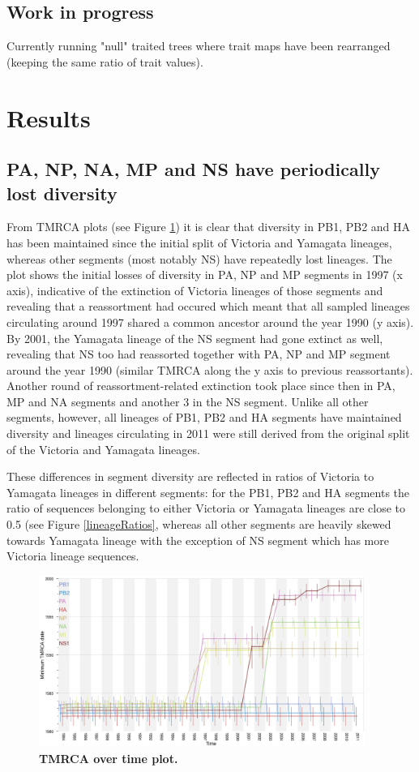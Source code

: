 \documentclass[11pt,oneside,letterpaper]{article}
\begin{document}
\subsection*{Work in progress}
Currently running "null" traited trees where trait maps have been rearranged (keeping the same ratio of trait values).


\section*{Results}

\subsection*{PA, NP, NA, MP and NS have periodically lost diversity}
From TMRCA plots (see Figure \ref{tmrcaOT}) it is clear that diversity in PB1, PB2 and HA has been maintained since the initial split of Victoria and Yamagata lineages, whereas other segments (most notably NS) have repeatedly lost lineages.
The plot shows the initial losses of diversity in PA, NP and MP segments in 1997 (x axis), indicative of the extinction of Victoria lineages of those segments and revealing that a reassortment had occured which meant that all sampled lineages circulating around 1997 shared a common ancestor around the year 1990 (y axis).
By 2001, the Yamagata lineage of the NS segment had gone extinct as well, revealing that NS too had reassorted together with PA, NP and MP segment around the year 1990 (similar TMRCA along the y axis to previous reassortants).
Another round of reassortment-related extinction took place since then in PA, MP and NA segments and another 3 in the NS segment.
Unlike all other segments, however, all lineages of PB1, PB2 and HA segments have maintained diversity and lineages circulating in 2011 were still derived from the original split of the Victoria and Yamagata lineages.

These differences in segment diversity are reflected in ratios of Victoria to Yamagata lineages in different segments: for the PB1, PB2 and HA segments the ratio of sequences belonging to either Victoria or Yamagata lineages are close to 0.5 (see Figure \ref{lineageRatios}, whereas all other segments are heavily skewed towards Yamagata lineage with the exception of NS segment which has more Victoria lineage sequences.

\begin{figure}[h]
	\centering		
	\includegraphics[width=0.95\textwidth]{figures/InfB_tmrcaOT_lines.png}
	\caption{\textbf{TMRCA over time plot.}}
	\label{tmrcaOT}
\end{figure}
\end{document}
